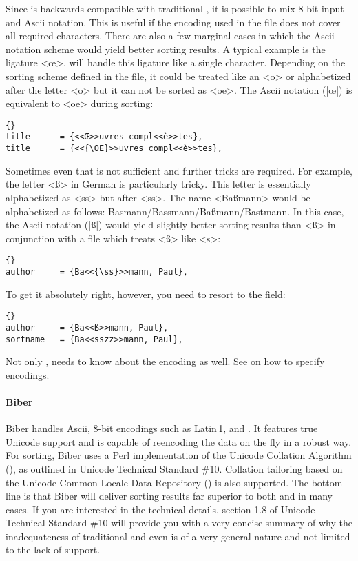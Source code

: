 \documentclass{ltxdockit}[2011/03/25]
\newcommand*{\biber}{Biber\xspace}
\begin{document}
Since  is backwards compatible with traditional \bibtex, it is possible to mix 8-bit input and Ascii notation. This is useful if the encoding used in the  file does not cover all required characters. There are also a few marginal cases in which the Ascii notation scheme would yield better sorting results. A typical example is the ligature <œ>.  will handle this ligature like a single character. Depending on the sorting scheme defined in the  file, it could be treated like an <o> or alphabetized after the letter <o> but it can not be sorted as <oe>. The Ascii notation (|\oe|) is equivalent to <oe> during sorting:

\begin{lstlisting}[style=bibtex,upquote]{}
title      = {<<Œ>>uvres compl<<è>>tes},
title      = {<<{\OE}>>uvres compl<<è>>tes},
\end{lstlisting}
%
Sometimes even that is not sufficient and further tricks are required. For example, the letter <ß> in German is particularly tricky. This letter is essentially alphabetized as <ss> but after <ss>. The name <Baßmann> would be alphabetized as follows: Basmann\slash Bassmann\slash Baßmann\slash Bastmann. In this case, the Ascii notation (|\ss|) would yield slightly better sorting results than <ß> in conjunction with a  file which treats <ß> like <s>:

\begin{lstlisting}[style=bibtex,upquote]{}
author     = {Ba<<{\ss}>>mann, Paul},
\end{lstlisting}
%
To get it absolutely right, however, you need to resort to the  field:

\begin{lstlisting}[style=bibtex,upquote]{}
author     = {Ba<<ß>>mann, Paul},
sortname   = {Ba<<sszz>>mann, Paul},
\end{lstlisting}
%
Not only \bibtex, \latex needs to know about the encoding as well. See  on how to specify encodings.

\paragraph{\biber}
\biber handles Ascii, 8-bit encodings such as Latin\,1, and \utf. It features true Unicode support and is capable of reencoding the  data on the fly in a robust way. For sorting, \biber uses a Perl implementation of the Unicode Collation Algorithm (), as outlined in Unicode Technical Standard \#10. Collation tailoring based on the Unicode Common Locale Data Repository () is also supported. The bottom line is that \biber will deliver sorting results far superior to both \bibtex and  in many cases. If you are interested in the technical details, section 1.8 of Unicode Technical Standard \#10 will provide you with a very concise summary of why the inadequateness of traditional \bibtex and even  is of a very general nature and not limited to the lack of \utf support.
\end{document}
